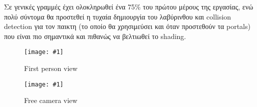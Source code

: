 \documentclass{article}
\newcommand{\includescreenshot}[1]{\texttt{[image: \#1]}}
\begin{document}
Σε γενικές γραμμές έχει ολοκληρωθεί ένα 75\% του πρώτου μέρους της εργασίας, ενώ πολύ
σύντομα θα προστεθεί η τυχαία δημιουργία του λαβύρινθου και collision detection για τον
παικτη (το οποίο θα χρησιμεύσει και όταν προστεθούν τα portals) που είναι πιο σημαντικά
και πιθανώς να βελτιωθεί το shading.

\begin{figure}
	\includescreenshot{1.png}
	\caption{First person view}
\end{figure}
\begin{figure}
	\includescreenshot{2.png}
	\caption{Free camera view}
\end{figure}
\end{document}
